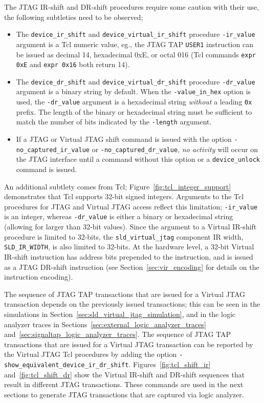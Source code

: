 \documentclass[10pt,twoside]{article}
\begin{document}
The JTAG IR-shift and DR-shift procedures require some 
caution with their use, the following subtleties need to be observed;
%
\begin{itemize}
\item The \verb+device_ir_shift+ and \verb+device_virtual_ir_shift+
procedure \verb+-ir_value+ argument is a Tcl numeric value,
eg., the JTAG TAP \verb+USER1+ instruction can be issued as
decimal 14, hexadecimal 0xE, or octal 016
(Tcl commands \verb+expr 0xE+ and \verb+expr 0x16+ both return 14).
%
\item The \verb+device_dr_shift+ and \verb+device_virtual_dr_shift+
procedure \verb+-dr_value+ argument is a binary string by default.
When the \verb+-value_in_hex+ option is used, the 
\verb+-dr_value+ argument is a hexadecimal string {\em without}
a leading \verb+0x+ prefix. The length of the binary or hexadecimal string
must be sufficient to match the number of bits indicated by
the \verb+-length+ argument.
%
\item If a JTAG or Virtual JTAG shift command is issued with 
the option \verb+-no_captured_ir_value+ or \verb+-no_captured_dr_value+,
{\em no activity} will occur on the JTAG interface until a
command without this option or a \verb+device_unlock+ command
is issued.
\end{itemize}
%
An additional subtlety comes from Tcl; 
Figure~\ref{fig:tcl_integer_support} demonstrates that Tcl supports 
32-bit signed integers. Arguments to the Tcl procedures for JTAG and 
Virtual JTAG access reflect this limitation; \verb+-ir_value+ is an integer,
whereas \verb+-dr_value+ is either a binary or hexadecimal string
(allowing for larger than 32-bit values).
Since the argument to a Virtual IR-shift procedure is limited to
32-bits, the \verb+sld_virtual_jtag+ component IR width, \verb+SLD_IR_WIDTH+,
is also limited to 32-bits. At the hardware level, a 32-bit
Virtual IR-shift instruction has address bits prepended to
the instruction, and is issued as a JTAG DR-shift instruction
(see Section~\ref{sec:vir_encoding} for details on the instruction encoding).

The sequence of JTAG TAP transactions that are issued for
a Virtual JTAG transaction depends on the previously issued
transactions; this can be seen in the simulations in
Section~\ref{sec:sld_virtual_jtag_simulation}, and in the 
logic analyzer traces in Sections~\ref{sec:external_logic_analyzer_traces}
and~\ref{sec:signaltap_logic_analyzer_traces}.
The sequence of JTAG TAP transactions that are issued for
a Virtual JTAG transaction can be reported by the 
Virtual JTAG Tcl procedures by adding the option
\verb+-show_equivalent_device_ir_dr_shift+.
Figures~\ref{fig:tcl_shift_ir} and~\ref{fig:tcl_shift_dr}
show the Virtual IR-shift and DR-shift sequences that result
in different JTAG transactions. These commands are used
in the next sections to generate JTAG transactions that
are captured via logic analyzer.
\end{document}
